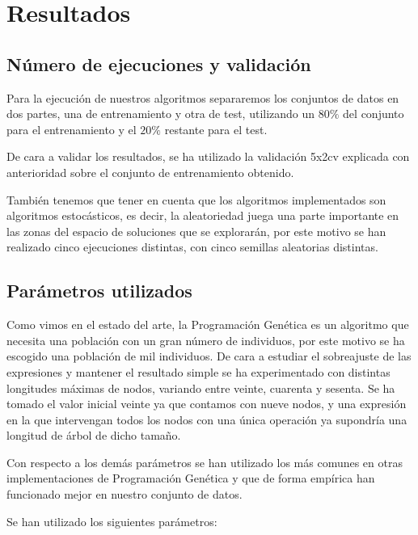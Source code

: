\section{Resultados} \label{resultados}

\subsection{Número de ejecuciones y validación}

Para la ejecución de nuestros algoritmos separaremos los conjuntos de datos en dos partes, una de entrenamiento y otra de test, utilizando un $80\%$ del conjunto para el entrenamiento y el $20\%$ restante para el test.

De cara a validar los resultados, se ha utilizado la validación 5x2cv explicada con anterioridad sobre el conjunto de entrenamiento obtenido.

También tenemos que tener en cuenta que los algoritmos implementados son algoritmos estocásticos, es decir, la aleatoriedad juega una parte importante en las zonas del espacio de soluciones que se explorarán, por este motivo se han realizado cinco ejecuciones distintas, con cinco semillas aleatorias distintas.

\subsection{Parámetros utilizados}

Como vimos en el estado del arte, la Programación Genética es un algoritmo que necesita una población con un gran número de individuos, por este motivo se ha escogido una población de mil individuos. De cara a estudiar el sobreajuste de las expresiones y mantener el resultado simple se ha experimentado con distintas longitudes máximas de nodos, variando entre veinte, cuarenta y sesenta. Se ha tomado el valor inicial veinte ya que contamos con nueve nodos, y una expresión en la que intervengan todos los nodos con una única operación ya supondría una longitud de árbol de dicho tamaño.

Con respecto a los demás parámetros se han utilizado los más comunes en otras implementaciones de Programación Genética y que de forma empírica han funcionado mejor en nuestro conjunto de datos.

Se han utilizado los siguientes parámetros:

